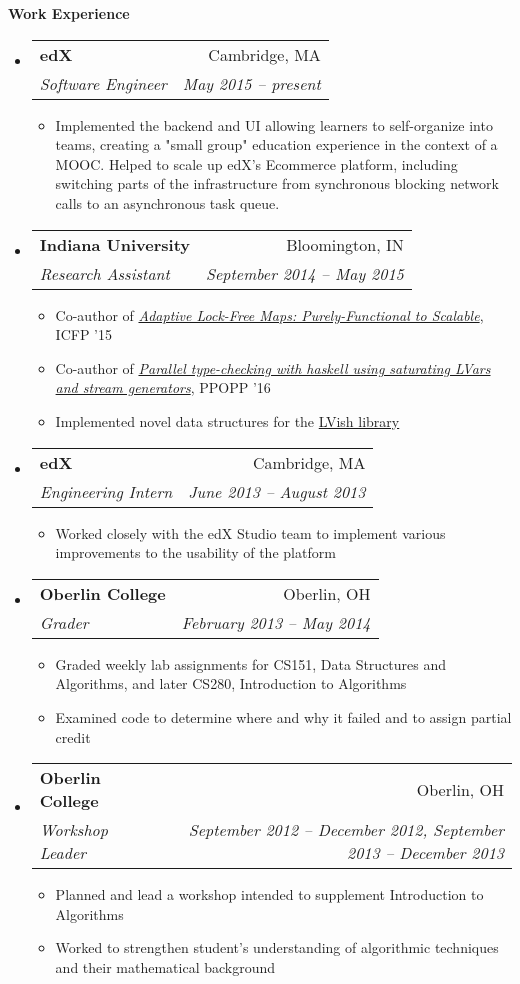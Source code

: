 \documentclass[letterpaper,11pt]{article}
\makeatletter
\newcommand{\resitem}[1]{\item #1 \vspace{-2pt}}
\newcommand{\resheading}[1]{{\large\colorbox{mygrey}{\begin{minipage}{\textwidth}{\textbf{#1\vphantom{p\^{E}}}}\end{minipage}}}}
\newcommand{\ressubheading}[4]{
  \begin{tabular*}{6.5in}{l@{\extracolsep{\fill}}r}
    \textbf{#1} & #2 \\
    \textit{#3} & \textit{#4} \\
  \end{tabular*}\vspace{-6pt}}
\makeatother
\begin{document}
\resheading{Work Experience}
\begin{itemize}
\item
  \ressubheading{edX}{Cambridge, MA}{Software Engineer}{May 2015 -- present}
  \begin{itemize}
  \resitem{Implemented the backend and UI allowing learners to self-organize into teams, creating a "small group" education experience in the context of a MOOC. Helped to scale up edX's Ecommerce platform, including switching parts of the infrastructure from synchronous blocking network calls to an asynchronous task queue.}
  \end{itemize}
\item
  \ressubheading{Indiana University}{Bloomington, IN}{Research Assistant}{September 2014 -- May 2015}
  \begin{itemize}
  \resitem{Co-author of \href{http://www.cs.indiana.edu/~rrnewton/papers/icfp15_adaptive_data.pdf}{\textit{Adaptive Lock-Free Maps: Purely-Functional to Scalable}}, ICFP '15}
  \resitem{Co-author of \href{https://dl.acm.org/citation.cfm?id=2851142}{\textit{Parallel type-checking with haskell using saturating LVars and stream generators}}, PPOPP '16}
  \resitem{Implemented novel data structures for the \href{http://github.com/iu-parfunc/lvars}{LVish library}}
  \end{itemize}
\item
  \ressubheading{edX}{Cambridge, MA}{Engineering Intern}{June 2013 -- August 2013}
  \begin{itemize}
  \resitem{Worked closely with the edX Studio team to implement various improvements to the usability of the platform}
  \end{itemize}
\item
  \ressubheading{Oberlin College}{Oberlin, OH}{Grader}{February 2013 -- May 2014}
  \begin{itemize}
    \resitem{Graded weekly lab assignments for CS151, Data Structures and Algorithms, and later CS280, Introduction to Algorithms}
    \resitem{Examined code to determine where and why it failed and to assign partial credit}
  \end{itemize}
\item
  \ressubheading{Oberlin College}{Oberlin, OH}{Workshop Leader}{September 2012 -- December 2012, September 2013 -- December 2013}
  \begin{itemize}
    \resitem{Planned and lead a workshop intended to supplement Introduction to Algorithms}
    \resitem{Worked to strengthen student's understanding of algorithmic techniques and their mathematical background}

\end{itemize}
\end{itemize}
\end{document}
